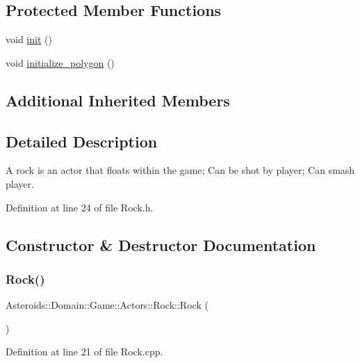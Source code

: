 \subsection*{Protected Member Functions}
\begin{DoxyCompactItemize}
\item 
void \hyperlink{classAsteroids_1_1Domain_1_1Game_1_1Actors_1_1Rock_a8bdb717103786b8a2e30ea29db791078}{init} ()
\item 
void \hyperlink{classAsteroids_1_1Domain_1_1Game_1_1Actors_1_1Rock_aa2a9c917715b56e4584f514c930c4690}{initialize\+\_\+polygon} ()
\end{DoxyCompactItemize}
\subsection*{Additional Inherited Members}


\subsection{Detailed Description}
A rock is an actor that floats within the game; Can be shot by player; Can smash player. 

Definition at line 24 of file Rock.\+h.



\subsection{Constructor \& Destructor Documentation}
\mbox{\label{classAsteroids_1_1Domain_1_1Game_1_1Actors_1_1Rock_aef8f46670fe5751800b9d76079adb5e5}} 
\subsubsection{\texorpdfstring{Rock()}{Rock()}}
{\footnotesize\ttfamily Asteroids\+::\+Domain\+::\+Game\+::\+Actors\+::\+Rock\+::\+Rock (\begin{DoxyParamCaption}{ }\end{DoxyParamCaption})}



Definition at line 21 of file Rock.\+cpp.



